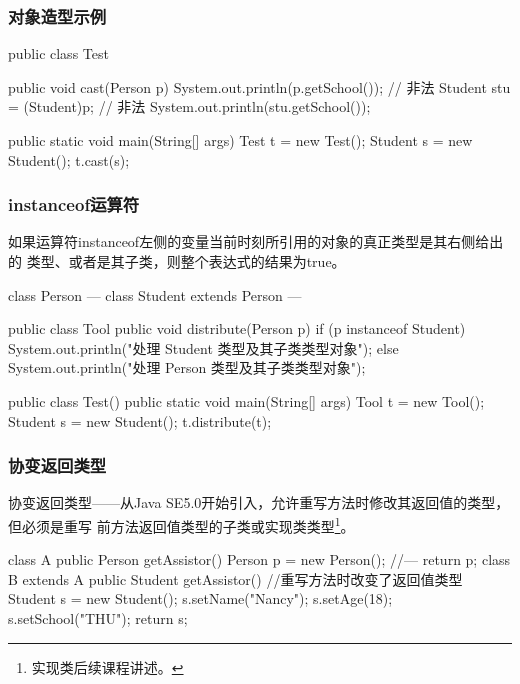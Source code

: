 \documentclass[hyperref={pdfpagelabels=false},compress,table]{beamer} %
\newcommand{\hei}{\CJKfamily{SimHei}}
\def\Red{\color{red}}
\begin{document}
\begin{frame}[fragile] %
\frametitle{对象造型示例}

\begin{javaCode}
public class Test {
  public void cast(Person p) {
    System.out.println(p.getSchool());      // 非法
    Student stu = (Student)p; // 非法
    System.out.println(stu.getSchool()); 
  }

  public static void main(String[] args) {
    Test t = new Test();
    Student s = new Student();
    t.cast(s);
  }
}
\end{javaCode}
\end{frame}

\begin{frame}[fragile] %
\frametitle{instanceof运算符}

{\footnotesize 如果运算符instanceof左侧的变量当前时刻所引用的对象的真正类型是其右侧给出的
  类型、{\Red 或者是其子类}，则整个表达式的结果为true。}
\begin{javaCode}
class Person { --- }
class Student extends Person { --- }

public class Tool {
  public void distribute(Person p) {
    if (p instanceof Student) {
      System.out.println("处理 Student 类型及其子类类型对象");
    } else {
      System.out.println("处理 Person 类型及其子类类型对象");
    }
  }
}
\end{javaCode}

\begin{javaCode}
public class Test() {
  public static void main(String[] args) {
    Tool t = new Tool();
    Student s = new Student();
    t.distribute(t);
  }
}
\end{javaCode}
\end{frame}

\begin{frame}[fragile] %
\frametitle{协变返回类型}

{\hei 协变返回类型}——从Java SE5.0开始引入，允许重写方法时修改其返回值的类型，但必须是重写
前方法返回值类型的{\hei 子类或实现类类型\footnote{实现类后续课程讲述。}}。
\begin{javaCode}
class A {
  public Person getAssistor() {
    Person p = new Person();
    //---
    return p;
  }
}
class B extends A {
  public Student getAssistor() { //重写方法时改变了返回值类型
    Student s = new Student();
    s.setName("Nancy");
    s.setAge(18);
    s.setSchool("THU");
    return s;
  }
}
\end{javaCode}
\end{frame}
\end{document}
